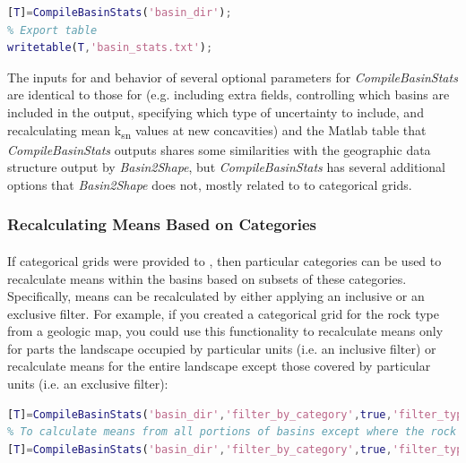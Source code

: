 \begin{lstlisting}[language=Matlab]
% Generate basin stats table
[T]=CompileBasinStats('basin_dir');
% Export table
writetable(T,'basin_stats.txt');
\end{lstlisting}

\noindent
The inputs for and behavior of several optional parameters for \textit{CompileBasinStats} are identical to those for  (e.g. including extra fields, controlling which basins are included in the output, specifying which type of uncertainty to include, and recalculating mean k\textsubscript{sn} values at new concavities) and the Matlab table that \textit{CompileBasinStats} outputs shares some similarities with the geographic data structure output by \textit{Basin2Shape}, but \textit{CompileBasinStats} has several additional options that \textit{Basin2Shape} does not, mostly related to to categorical grids.

\subsubsection{Recalculating Means Based on Categories}
\paragraph{}If categorical grids were provided to , then particular categories can be used to recalculate means within the basins based on subsets of these categories. Specifically, means can be recalculated by either applying an inclusive or an exclusive filter. For example, if you created a categorical grid for the rock type from a geologic map, you could use this functionality to recalculate means only for parts the landscape occupied by particular units (i.e. an inclusive filter) or recalculate means for the entire landscape except those covered by particular units (i.e. an exclusive filter):

\begin{lstlisting}[language=Matlab]
% To calculate means only from portions of a basin defined by certain rock types
[T]=CompileBasinStats('basin_dir','filter_by_category',true,'filter_type','include','cat_grid','geology','cat_values',{'pCc','grMz','pC','gr-m','Pc','grPz','grpC','gr'});
% To calculate means from all portions of basins except where the rock types are certain types
[T]=CompileBasinStats('basin_dir','filter_by_category',true,'filter_type','exclude','cat_grid','geology','cat_values',{'Q','Qpc','Qg','Qls','Qs','Qv','water','undef'});
\end{lstlisting}

